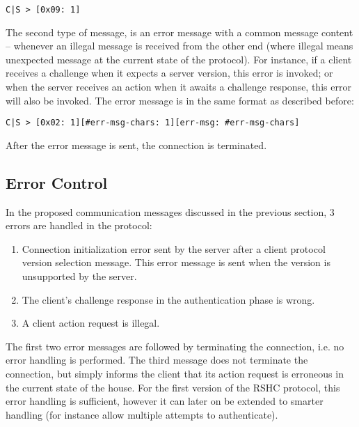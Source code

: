 \begin{verbatim}
C|S > [0x09: 1]
\end{verbatim}

\noindent
The second type of message, is an error message with a common message content -- whenever an illegal message is received from the other end (where illegal means unexpected message at the current state of the protocol). For instance, if a client receives a challenge when it expects a server version, this error is invoked; or when the server receives an action when it awaits a challenge response, this error will also be invoked. The error message is in the same format as described before:

\begin{verbatim}
C|S > [0x02: 1][#err-msg-chars: 1][err-msg: #err-msg-chars]
\end{verbatim}

\noindent
After the error message is sent, the connection is terminated.


\subsection{Error Control}
\label{sec:pdus:err}

In the proposed communication messages discussed in the previous section, 3 errors are handled in the protocol:
\begin{enumerate}
\item Connection initialization error sent by the server after a client protocol version selection message. This error message is sent when the version is unsupported by the server.
\item The client's challenge response in the authentication phase is wrong.
\item A client action request is illegal.
\end{enumerate}

The first two error messages are followed by terminating the connection, i.e. no error handling is performed. The third message does not terminate the connection, but simply informs the client that its action request is erroneous in the current state of the house. For the first version of the RSHC protocol, this error handling is sufficient, however it can later on be extended to smarter handling (for instance allow multiple attempts to authenticate).


